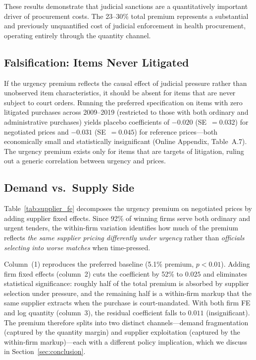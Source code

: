 These results demonstrate that judicial sanctions are a quantitatively important driver of procurement costs. The 23--30\% total premium represents a substantial and previously unquantified cost of judicial enforcement in health procurement, operating entirely through the quantity channel.

\subsection{Falsification: Items Never Litigated}
\label{sec:placebo}

If the urgency premium reflects the causal effect of judicial pressure
rather than unobserved item characteristics, it should be absent for
items that are never subject to court orders. Running the preferred
specification on items with zero litigated purchases across 2009--2019
(restricted to those with both ordinary and administrative purchases)
yields placebo coefficients of $-0.020$ (SE~$= 0.032$) for negotiated
prices and $-0.031$ (SE~$= 0.045$) for reference prices---both
economically small and statistically insignificant (Online Appendix,
Table~A.7). The urgency premium exists only for items
that are targets of litigation, ruling out a generic correlation
between urgency and prices.

\subsection{Demand vs.\ Supply Side}
\label{sec:supplier_fe}

Table~\ref{tab:supplier_fe} decomposes the urgency premium on negotiated
prices by adding supplier fixed effects. Since 92\% of winning firms
serve both ordinary and urgent tenders, the within-firm variation
identifies how much of the premium reflects \emph{the same supplier
pricing differently under urgency} rather than \emph{officials selecting
into worse matches} when time-pressed.



Column~(1) reproduces the preferred baseline (5.1\% premium, $p < 0.01$).
Adding firm fixed effects (column~2) cuts the coefficient by 52\% to
$0.025$ and eliminates statistical significance: roughly half of the total
premium is absorbed by supplier selection under pressure, and the
remaining half is a within-firm markup that the same supplier extracts
when the purchase is court-mandated. With both firm FE and log quantity
(column~3), the residual coefficient falls to $0.011$ (insignificant).
The premium therefore splits into two distinct channels---demand
fragmentation (captured by the quantity margin) and supplier exploitation
(captured by the within-firm markup)---each with a different policy
implication, which we discuss in Section~\ref{sec:conclusion}.

